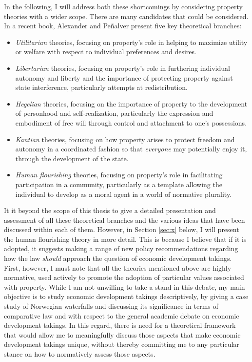 In the following, I will address both these shortcomings by considering property theories with a wider scope. There are many candidates that could be considered. In a recent book, Alexander and Pe\~{n}alver present five key theoretical branches: 
\begin{itemize}
\item {\it Utilitarian} theories, focusing on property's role in helping to maximize utility or welfare with respect to individual preferences and desires. 
\item {\it Libertarian} theories, focusing on property's role in furthering individual autonomy and liberty and the importance of protecting property against state interference, particularly attempts at redistribution. 
\item {\it Hegelian} theories, focusing on the importance of property to the development of personhood and self-realization, particularly the expression and embodiment of free will through control and attachment to one's possessions. 
\item {\it Kantian} theories, focusing on how property arises to protect freedom and autonomy in a coordinated fashion so that {\it everyone} may potentially enjoy it, through the development of the state. 
\item {\it  Human flourishing} theories, focusing on property's role in facilitating participation in a community, particularly as a template allowing the individual to develop as a moral agent in a world of normative plurality.
\end{itemize}

It it beyond the scope of this thesis to give a detailed presentation and assessment of all these theoretical branches and the various ideas that have been discussed within each of them. However, in Section \ref{sec:x} below, I will present the human flourishing theory in more detail. This is because I believe that if it is adopted, it suggests making a range of new policy recommendations regarding how the law {\it should} approach the question of economic development takings. First, however, I must note that all the theories mentioned above are highly normative, used actively to promote the adoption of particular values associated with property. While I am not unwilling to take a stand in this debate, my main objective is to study economic development takings descriptively, by giving a case study of Norwegian waterfalls and discussing its significance in terms of comparative law and with respect to the general academic debate on economic development takings. In this regard, there is need for a theoretical framework that would allow me to meaningfully discuss those aspects that make economic development takings unique, without thereby committing me to any particular stance on how to normatively assess those aspects. 

